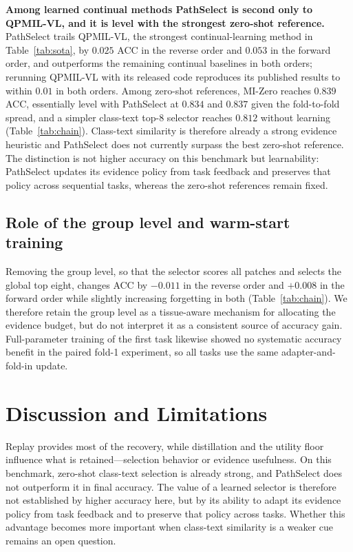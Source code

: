 \documentclass{article}
\begin{document}
\textbf{Among learned continual methods PathSelect is second only to QPMIL-VL, and it is level with the strongest zero-shot reference.} PathSelect trails QPMIL-VL, the strongest continual-learning method in Table~\ref{tab:sota}, by $0.025$ ACC in the reverse order and $0.053$ in the forward order, and outperforms the remaining continual baselines in both orders; rerunning QPMIL-VL with its released code reproduces its published results to within $0.01$ in both orders. Among zero-shot references, MI-Zero reaches $0.839$ ACC, essentially level with PathSelect at $0.834$ and $0.837$ given the fold-to-fold spread, and a simpler class-text top-8 selector reaches $0.812$ without learning (Table~\ref{tab:chain}). Class-text similarity is therefore already a strong evidence heuristic and PathSelect does not currently surpass the best zero-shot reference. The distinction is not higher accuracy on this benchmark but learnability: PathSelect updates its evidence policy from task feedback and preserves that policy across sequential tasks, whereas the zero-shot references remain fixed.

\subsection{Role of the group level and warm-start training}
\label{ssec:order}

Removing the group level, so that the selector scores all patches and selects the global top eight, changes ACC by $-0.011$ in the reverse order and $+0.008$ in the forward order while slightly increasing forgetting in both (Table~\ref{tab:chain}). We therefore retain the group level as a tissue-aware mechanism for allocating the evidence budget, but do not interpret it as a consistent source of accuracy gain. Full-parameter training of the first task likewise showed no systematic accuracy benefit in the paired fold-1 experiment, so all tasks use the same adapter-and-fold-in update.

\FloatBarrier
\section{Discussion and Limitations}
\label{sec:discussion}

Replay provides most of the recovery, while distillation and the utility floor influence what is retained---selection behavior or evidence usefulness. On this benchmark, zero-shot class-text selection is already strong, and PathSelect does not outperform it in final accuracy. The value of a learned selector is therefore not established by higher accuracy here, but by its ability to adapt its evidence policy from task feedback and to preserve that policy across tasks. Whether this advantage becomes more important when class-text similarity is a weaker cue remains an open question.
\end{document}

